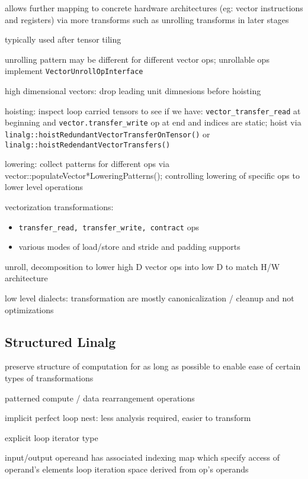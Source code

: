 \documentclass[8pt]{extarticle}
\begin{document}
\begin{multicols*}{2}
allows further mapping to concrete hardware architectures (eg: vector instructions and registers) via more transforms such as unrolling transforms in later stages

typically used after tensor tiling

unrolling pattern may be different for different vector ops; unrollable ops implement \verb|VectorUnrollOpInterface|

high dimensional vectors: drop leading unit dimnesions before hoisting

hoisting: inspect loop carried tensors to see if we have: \verb|vector_transfer_read| at beginning and \verb|vector.transfer_write| op at end and indices are static; hoist via \verb|linalg::hoistRedundantVectorTransferOnTensor()| or \verb|linalg::hoistRedendantVectorTransfers()|

lowering: collect patterns for different ops via vector::populateVector*LoweringPatterns(); controlling lowering of specific ops to lower level operations

vectorization transformations:
\begin{itemize}
\item \verb|transfer_read, transfer_write, contract| ops
\item various modes of load/store and stride and padding supports
\end{itemize}

unroll, decomposition to lower high D vector ops into low D to match H/W architecture

low level dialects: transformation are mostly canonicalization / cleanup and not optimizations

\vfill\null
\columnbreak

\subsection{Structured Linalg}

preserve structure of computation for as long as possible to enable ease of certain types of transformations

patterned compute / data rearrangement operations

implicit perfect loop nest: less analysis required, easier to transform 

explicit loop iterator type

input/output opereand has associated indexing map which specify access of operand's elements
loop iteration space derived from op's operands


\end{multicols*}
\end{document}
